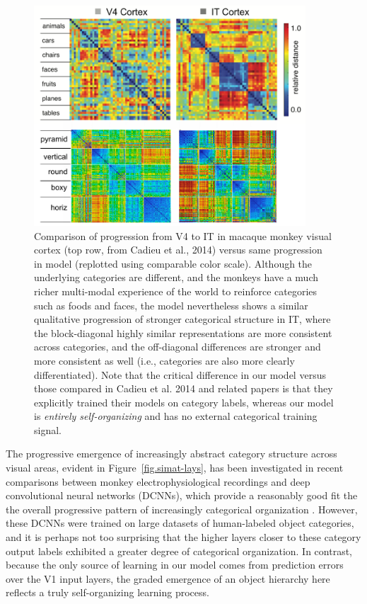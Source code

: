 \documentclass[11pt,twoside]{article}
\newif\myifpdf
\begin{document}
\begin{figure}
  \centering\includegraphics[width=4in]{fig_deepleabra_wwi_rsa_leabra_macaque}
  \caption{\footnotesize Comparison of progression from V4 to IT in macaque monkey visual cortex (top row, from Cadieu et al., 2014) versus same progression in model (replotted using comparable color scale).  Although the underlying categories are different, and the monkeys have a much richer multi-modal experience of the world to reinforce categories such as foods and faces, the model nevertheless shows a similar qualitative progression of stronger categorical structure in IT, where the block-diagonal highly similar representations are more consistent across categories, and the off-diagonal differences are stronger and more consistent as well (i.e., categories are also more clearly differentiated).  Note that the critical difference in our model versus those compared in Cadieu et al. 2014 and related papers is that they explicitly trained their models on category labels, whereas our model is \emph{entirely self-organizing} and has no external categorical training signal.}
  \label{fig.macaque}
\end{figure}

The progressive emergence of increasingly abstract category structure across visual areas, evident in Figure~\ref{fig.simat-lays}, has been investigated in recent comparisons between monkey electrophysiological recordings and deep convolutional neural networks (DCNNs), which provide a reasonably good fit the the overall progressive pattern of increasingly categorical organization \citep{CadieuHongYaminsEtAl14}.  However, these DCNNs were trained on large datasets of human-labeled object categories, and it is perhaps not too surprising that the higher layers closer to these category output labels exhibited a greater degree of categorical organization.  In contrast, because the only source of learning in our model comes from prediction errors over the V1 input layers, the graded emergence of an object hierarchy here reflects a truly self-organizing learning process.
\end{document}
